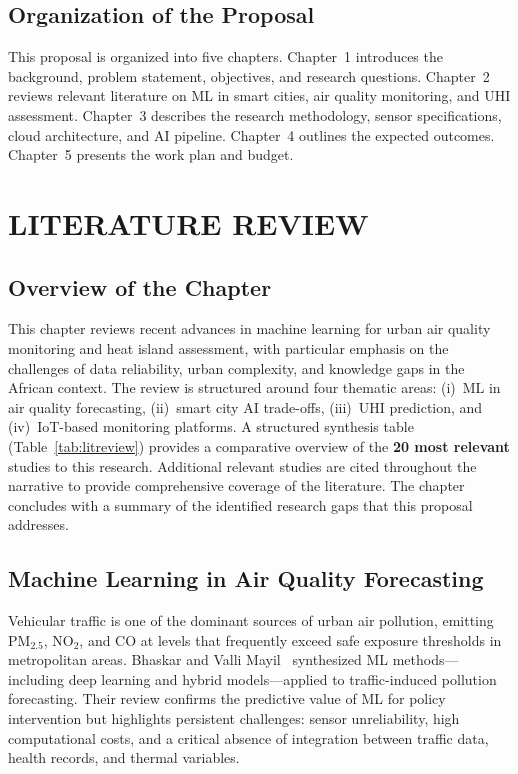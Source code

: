 \section{Organization of the Proposal}
This proposal is organized into five chapters. Chapter~1 introduces the background, problem statement, objectives, and research questions. Chapter~2 reviews relevant literature on ML in smart cities, air quality monitoring, and UHI assessment. Chapter~3 describes the research methodology, sensor specifications, cloud architecture, and AI pipeline. Chapter~4 outlines the expected outcomes. Chapter~5 presents the work plan and budget.

\chapter{LITERATURE REVIEW}

\section{Overview of the Chapter}
This chapter reviews recent advances in machine learning for urban air quality monitoring and heat island assessment, with particular emphasis on the challenges of data reliability, urban complexity, and knowledge gaps in the African context. The review is structured around four thematic areas: (i)~ML in air quality forecasting, (ii)~smart city AI trade-offs, (iii)~UHI prediction, and (iv)~IoT-based monitoring platforms. A structured synthesis table (Table~\ref{tab:litreview}) provides a comparative overview of the \textbf{20 most relevant} studies to this research. Additional relevant studies are cited throughout the narrative to provide comprehensive coverage of the literature. The chapter concludes with a summary of the identified research gaps that this proposal addresses.

\section{Machine Learning in Air Quality Forecasting}
Vehicular traffic is one of the dominant sources of urban air pollution, emitting PM$_{2.5}$, NO$_2$, and CO at levels that frequently exceed safe exposure thresholds in metropolitan areas. Bhaskar and Valli Mayil~\cite{bhaskar2025} synthesized ML methods—including deep learning and hybrid models—applied to traffic-induced pollution forecasting. Their review confirms the predictive value of ML for policy intervention but highlights persistent challenges: sensor unreliability, high computational costs, and a critical absence of integration between traffic data, health records, and thermal variables.

